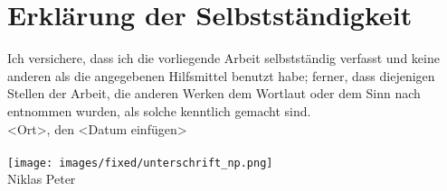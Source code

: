 


\chapter*{Erklärung der Selbstständigkeit}
 \thispagestyle{empty}
%
Ich versichere, dass ich die vorliegende Arbeit selbstständig verfasst und keine anderen als die angegebenen Hilfsmittel benutzt habe; ferner, dass diejenigen Stellen der Arbeit, die anderen Werken dem Wortlaut oder dem Sinn nach entnommen wurden, als solche kenntlich gemacht sind.
%
\mbox{}\vspace{4\baselineskip}\\
%
<Ort>, den <Datum einfügen> \\
\mbox{}\vspace{2\baselineskip}\\
\texttt{[image: images/fixed/unterschrift\_np.png]}\\
Niklas Peter \\


